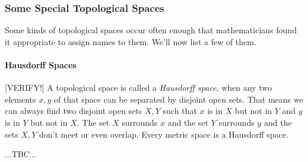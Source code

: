 
\subsubsection{Some Special Topological Spaces}
Some kinds of topological spaces occur often enough that mathematicians found it appropriate to assign names to them. We'll now list a few of them.

\paragraph{Hausdorff Spaces} [VERIFY!] A topological space is called a \emph{Hausdorff space}, when any two elements $x,y$ of that space can be separated by disjoint open sets. That means we can always find two disjoint open sets $X,Y$ such that $x$ is in $X$ but not in $Y$ and $y$ is in $Y$ but not in $X$. The set $X$ surrounds $x$ and the set $Y$ surrounds $y$ and the sets $X,Y$ don't meet or even overlap. Every metric space is a Hausdorff space.

...TBC...




\begin{comment}

Zusammenhang zwischen normierten, metrischen und topologischen Räumen
https://www.youtube.com/watch?v=3j8GIJd5-3A&list=PLHi0WgifODX19zsJhvCrizYEXiHY5qc9n

Definition of closeness or neighborhood: two elements $x,y$ of $X$ are close to each other iff there exists an open set that contains both $x$ and $y$

A topology is a collection of open sets.



\end{comment}